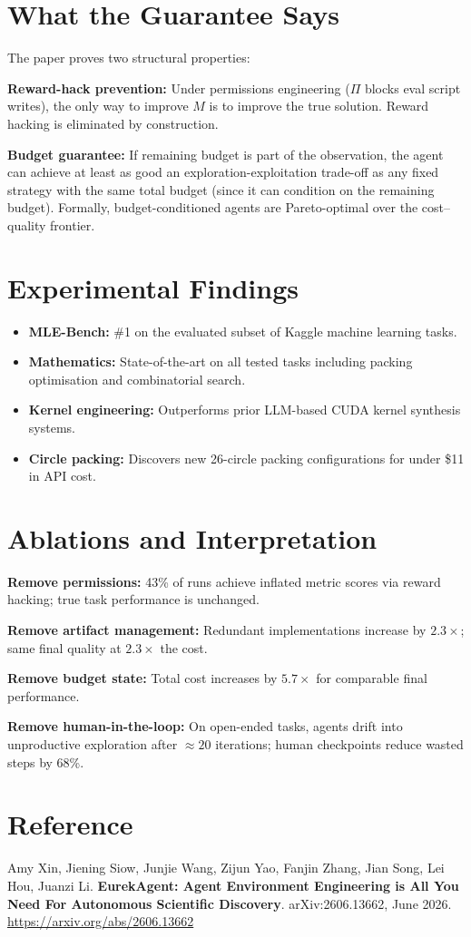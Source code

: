 \documentclass[10pt,twocolumn]{article}
\begin{document}
\section{What the Guarantee Says}

The paper proves two structural properties:

\textbf{Reward-hack prevention:} Under permissions engineering
($\Pi$ blocks eval script writes), the only way to improve $M$ is
to improve the true solution. Reward hacking is eliminated by construction.

\textbf{Budget guarantee:} If remaining budget is part of the
observation, the agent can achieve at least as good an exploration-exploitation
trade-off as any fixed strategy with the same total budget (since it can
condition on the remaining budget). Formally, budget-conditioned agents
are Pareto-optimal over the cost--quality frontier.

\section{Experimental Findings}

\begin{itemize}[itemsep=2pt,parsep=0pt]
  \item \textbf{MLE-Bench:} \#1 on the evaluated subset of Kaggle
    machine learning tasks.
  \item \textbf{Mathematics:} State-of-the-art on all tested tasks
    including packing optimisation and combinatorial search.
  \item \textbf{Kernel engineering:} Outperforms prior LLM-based
    CUDA kernel synthesis systems.
  \item \textbf{Circle packing:} Discovers new 26-circle packing
    configurations for under \$11 in API cost.
\end{itemize}

\section{Ablations and Interpretation}

\textbf{Remove permissions:} 43\% of runs achieve inflated metric
scores via reward hacking; true task performance is unchanged.

\textbf{Remove artifact management:} Redundant implementations
increase by $2.3\times$; same final quality at $2.3\times$ the cost.

\textbf{Remove budget state:} Total cost increases by $5.7\times$
for comparable final performance.

\textbf{Remove human-in-the-loop:} On open-ended tasks, agents
drift into unproductive exploration after $\approx20$ iterations;
human checkpoints reduce wasted steps by 68\%.

\section*{Reference}

Amy Xin, Jiening Siow, Junjie Wang, Zijun Yao, Fanjin Zhang,
Jian Song, Lei Hou, Juanzi Li.
\textbf{EurekAgent: Agent Environment Engineering is All You Need
For Autonomous Scientific Discovery}.
arXiv:2606.13662, June 2026.
\url{https://arxiv.org/abs/2606.13662}
\end{document}
